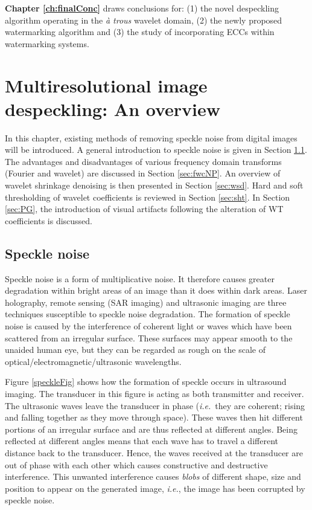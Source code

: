 \documentclass[12pt]{report}
\begin{document}
{\bf Chapter \ref{ch:finalConc}} draws conclusions for: 
(1) the novel despeckling algorithm operating in the \emph{\`a trous} wavelet domain,
(2) the newly proposed watermarking algorithm and 
(3) the study of incorporating ECCs within watermarking systems.


\chapter{Multiresolutional image despeckling: An overview}
\label{ch:introDN}
In this chapter, existing methods of removing speckle noise from digital images will
be introduced. A general introduction to speckle noise is given in Section \ref{sec:speckle}.
The advantages and disadvantages of various frequency domain transforms (Fourier and wavelet) are discussed
in Section \ref{sec:fwcNP}.
An overview of wavelet shrinkage denoising is then presented in Section \ref{sec:wsd}.
Hard and soft thresholding of wavelet coefficients is reviewed in Section \ref{sec:sht}.
In Section \ref{sec:PG}, the introduction of visual artifacts following the alteration of
WT coefficients is discussed.

\section{Speckle noise}
\label{sec:speckle}

Speckle noise is a form of multiplicative noise. It therefore causes greater
degradation within bright areas of an image than it does within dark areas. 
Laser holography, remote sensing (SAR imaging) and
ultrasonic imaging are three techniques susceptible to speckle noise degradation.
The formation of speckle noise is caused by the interference of coherent light or waves
which have been scattered from an irregular surface. These surfaces may appear
smooth to the unaided human eye, but they can be regarded as rough on the scale of
optical/electromagnetic/ultrasonic wavelengths.

Figure \ref{speckleFig} shows how the formation of speckle occurs in ultrasound imaging.
The transducer in this figure
is acting as both transmitter and receiver.
The ultrasonic waves leave the transducer in phase (\emph{i.e.}~they are coherent;
rising and falling together as they move through space). 
These waves then
hit different portions of an irregular surface and are thus reflected at different angles.
Being reflected at different angles means that each wave has to travel a
different distance back to the transducer. Hence, the waves received at the transducer are out of phase 
with each other which 
causes constructive and destructive interference. This unwanted interference causes \emph{blobs} of different shape,
size and position to appear on the generated image, \emph{i.e.}, the image has been corrupted by speckle noise.
\end{document}
